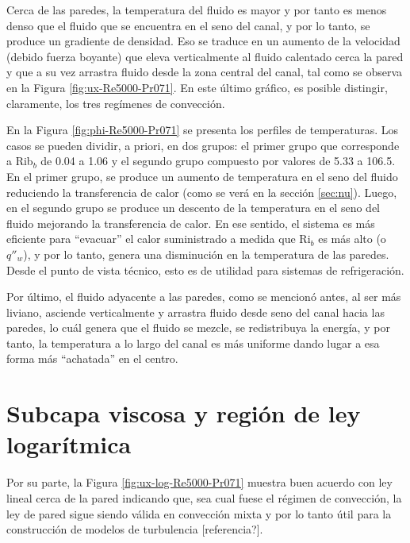 Cerca de las paredes, la temperatura del fluido es mayor y por tanto es menos denso que el fluido que se encuentra en el seno del canal, y por lo tanto, se produce un gradiente de densidad. Eso se traduce en un aumento de la velocidad (debido fuerza boyante) que eleva verticalmente al fluido calentado cerca la pared y que a su vez arrastra fluido desde la zona central del canal, tal como se observa en la Figura \ref{fig:ux-Re5000-Pr071}. En este último gráfico, es posible distingir, claramente, los tres regímenes de convección. 

En la Figura \ref{fig:phi-Re5000-Pr071} se presenta los perfiles de temperaturas. Los casos se pueden dividir, a priori, en dos grupos: el primer grupo que corresponde a Rib$_b$ de 0.04 a 1.06 y el segundo grupo compuesto por valores de 5.33 a 106.5. En el primer grupo, se produce un aumento de temperatura en el seno del fluido reduciendo la transferencia de calor (como se verá en la sección \ref{sec:nu}). Luego, en el segundo grupo se produce un descento de la temperatura en el seno del fluido mejorando la transferencia de calor. En ese sentido, el sistema es más eficiente para ``evacuar'' el calor suministrado a medida que Ri$_b$ es más alto (o $q''_w$), y por lo tanto, genera una disminución en la temperatura de las paredes. Desde el punto de vista técnico, esto es de utilidad para sistemas de refrigeración. 

Por último, el fluido adyacente a las paredes, como se mencionó antes, al ser más liviano, asciende verticalmente y arrastra fluido desde seno del canal hacia las paredes, lo cuál genera que el fluido se mezcle, se redistribuya la energía, y por tanto, la temperatura a lo largo del canal es más uniforme dando lugar a esa forma más ``achatada'' en el centro.       


\section{Subcapa viscosa y región de ley logarítmica}

Por su parte, la Figura \ref{fig:ux-log-Re5000-Pr071} muestra buen acuerdo con ley lineal  cerca de la pared indicando que, sea cual fuese el régimen de convección, la ley de pared sigue siendo válida en convección mixta y por lo tanto útil para la construcción de modelos de turbulencia [referencia?].   


